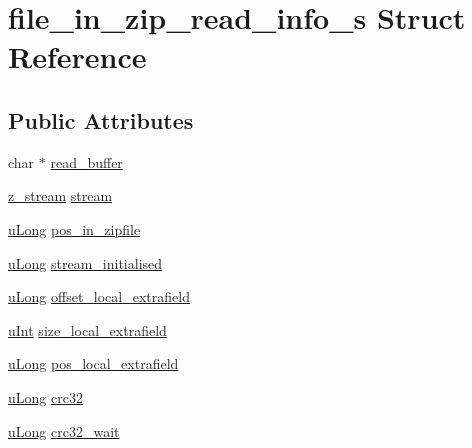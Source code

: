 \hypertarget{structfile__in__zip__read__info__s}{\section{file\-\_\-in\-\_\-zip\-\_\-read\-\_\-info\-\_\-s Struct Reference}
\label{structfile__in__zip__read__info__s}
}
\subsection*{Public Attributes}
\begin{DoxyCompactItemize}
\item 
char $\ast$ \hyperlink{structfile__in__zip__read__info__s_a6310a19e33ac2cf3280aa74199cbd89b}{read\-\_\-buffer}
\item 
\hyperlink{zlib_8h_afa60092f4e0b9bc4f23b41c6930463f0}{z\-\_\-stream} \hyperlink{structfile__in__zip__read__info__s_a6973c6240c02a1c8e014d6078bb2bbfc}{stream}
\item 
\hyperlink{zconf_8h_a154b3b80120c903a368fec5f11f3007a}{u\-Long} \hyperlink{structfile__in__zip__read__info__s_a01d6195d7977bec4db506cdbee9b8a13}{pos\-\_\-in\-\_\-zipfile}
\item 
\hyperlink{zconf_8h_a154b3b80120c903a368fec5f11f3007a}{u\-Long} \hyperlink{structfile__in__zip__read__info__s_a8f2d03c24a7b1058288606687eb6d448}{stream\-\_\-initialised}
\item 
\hyperlink{zconf_8h_a154b3b80120c903a368fec5f11f3007a}{u\-Long} \hyperlink{structfile__in__zip__read__info__s_a8e3a240c367e7d6d199859b1b311128c}{offset\-\_\-local\-\_\-extrafield}
\item 
\hyperlink{zconf_8h_a87d141052bcd5ec8a80812a565c70369}{u\-Int} \hyperlink{structfile__in__zip__read__info__s_a9abdc9b3f3d500d894a635cc9e956180}{size\-\_\-local\-\_\-extrafield}
\item 
\hyperlink{zconf_8h_a154b3b80120c903a368fec5f11f3007a}{u\-Long} \hyperlink{structfile__in__zip__read__info__s_aa07cf3d7d5d68e9537ffe99499d7db6f}{pos\-\_\-local\-\_\-extrafield}
\item 
\hyperlink{zconf_8h_a154b3b80120c903a368fec5f11f3007a}{u\-Long} \hyperlink{structfile__in__zip__read__info__s_a9d7e4dc6f312fb59bf8e60fb952f4d68}{crc32}
\item 
\hyperlink{zconf_8h_a154b3b80120c903a368fec5f11f3007a}{u\-Long} \hyperlink{structfile__in__zip__read__info__s_a6120c521be40e8ba530249f0c766ab9d}{crc32\-\_\-wait}
\item 

\end{DoxyCompactItemize}
